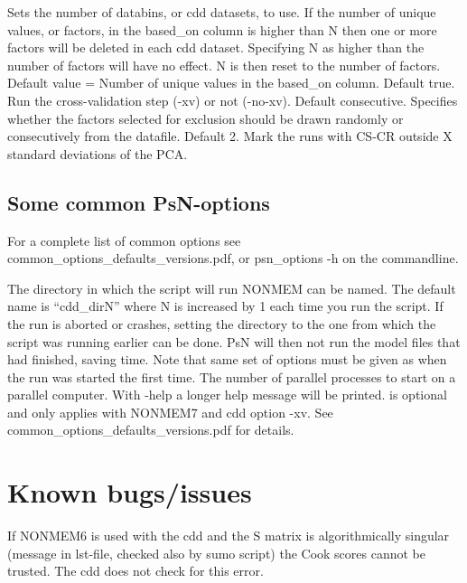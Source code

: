 \begin{optionlist}
Sets the number of databins, or cdd datasets, to use. If the number of unique values, or factors, in the based\_on column is higher than N then one or more factors will be deleted in each cdd dataset. Specifying N as higher than the number of factors will have no effect. N is then reset to the number of factors. Default value = Number of unique values in the based\_on column. 
\nextopt
{}
Default true. Run the cross-validation step (-xv) or not (-no-xv). 
\nextopt
{}
Default consecutive. Specifies whether the factors selected for exclusion should be drawn randomly or consecutively from the datafile. 
\nextopt
{}
Default 2. Mark the runs with CS-CR outside X standard deviations of the PCA. 
\nextopt
\end{optionlist}

\subsection{Some common PsN-options}

For a complete list of common options see common\_options\_defaults\_versions.pdf, or psn\_options -h on the commandline.

\begin{optionlist}
The directory in which the script will run NONMEM can be named. The default name is “cdd\_dirN” where N is increased by 1 each time you run the script. If the run is aborted or crashes, setting the directory to the one from which the script was running earlier can be done. PsN will then not run the model files that had finished, saving time. Note that same set of options must be given as when the run was started the first time. 
\nextopt
{}
The number of parallel processes to start on a parallel computer. 
\nextopt
{}
With -help a longer help message will be printed. 
\nextopt
{}
is optional and only applies with NONMEM7 and cdd option -xv. See common\_options\_defaults\_versions.pdf for details.

\nextopt
\end{optionlist}


\section{Known bugs/issues}

If NONMEM6 is used with the cdd and the S matrix is algorithmically singular (message in lst-file, checked also by sumo script) the Cook scores cannot  be trusted. The cdd does not check for this error. 


